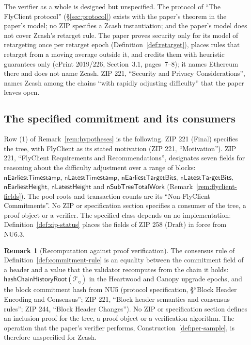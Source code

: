 \documentclass[11pt,a4paper]{article}
\theoremstyle{definition}
\newtheorem{remark}[theorem]{Remark}
\begin{document}
The verifier as a whole is designed but unspecified. The protocol of ``The
FlyClient protocol'' (\S\ref{sec:protocol}) exists with the paper's theorem
in the paper's model; no ZIP specifies a Zcash instantiation; and the paper's
model does not cover Zcash's retarget rule. The paper proves security only
for its model of retargeting once per retarget epoch
(Definition~\ref{def:retarget}), places rules that retarget from a moving
average outside it, and credits them with heuristic guarantees only
(ePrint 2019/226, Section~3.1, pages~7--8); it names Ethereum there and does
not name Zcash. ZIP 221, ``Security and Privacy Considerations'', names Zcash
among the chains ``with rapidly adjusting difficulty'' that the paper leaves
open.

\subsection{The specified commitment and its consumers}
\label{sec:boundary-specified}

Row (1) of Remark~\ref{rem:hypotheses} is the following. ZIP 221 (Final)
specifies the tree, with FlyClient as its stated motivation (ZIP 221,
``Motivation''). ZIP 221, ``FlyClient Requirements and Recommendations'',
designates seven fields for reasoning about the difficulty adjustment over a
range of blocks: $\mathsf{nEarliestTimestamp}$, $\mathsf{nLatestTimestamp}$,
$\mathsf{nEarliestTargetBits}$, $\mathsf{nLatestTargetBits}$,
$\mathsf{nEarliestHeight}$, $\mathsf{nLatestHeight}$ and
$\mathsf{nSubTreeTotalWork}$ (Remark~\ref{rem:flyclient-fields}). The pool
roots and transaction counts are its ``Non-FlyClient Commitments''. No ZIP or
specification section specifies a consumer of the tree, a proof object or a
verifier. The specified class depends on no implementation:
Definition~\ref{def:zip-status} places the fields of ZIP 258 (Draft) in force
from NU6.3.

\begin{remark}[Recomputation against proof verification]\label{rem:recompute}
The consensus rule of Definition~\ref{def:commitment-rule} is an equality
between the commitment field of a header and a value that the validator
recomputes from the chain it holds: $\mathsf{hashChainHistoryRoot}(
\mathcal{T}_\eta)$ in the Heartwood and Canopy upgrade epochs, and the block
commitment hash from NU5 (protocol specification, \S``Block Header Encoding
and Consensus''; ZIP 221, ``Block header semantics and consensus rules'';
ZIP 244, ``Block Header Changes''). No ZIP or specification section defines
an inclusion proof for the tree, a proof object or a verification
algorithm. The operation that the paper's verifier performs,
Construction~\ref{def:per-sample}, is therefore unspecified for Zcash.
\end{remark}
\end{document}
